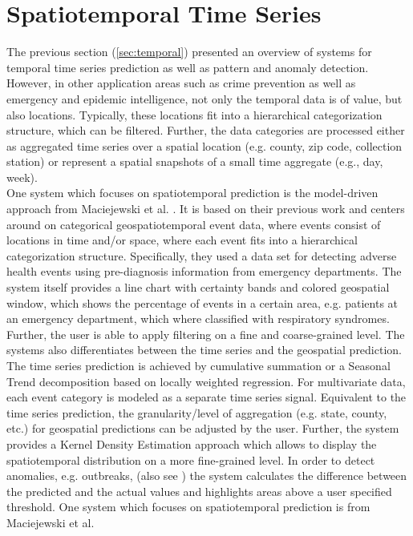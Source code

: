 \documentclass[electronic]{vgtc}             %
\begin{document}
\section{Spatiotemporal Time Series\label{sec:spatiotemp}}
The previous section (\autoref{sec:temporal}) presented an overview of systems for temporal time series prediction as well as pattern and anomaly detection. 
However, in other application areas such as crime prevention as well as emergency and epidemic intelligence, not only the temporal data is of value, but also locations. 
Typically, these locations fit into a hierarchical categorization structure, which can be filtered.
Further, the data categories are processed either as aggregated time series over a spatial location (e.g. county, zip code, collection station) or represent a spatial snapshots of a small time aggregate (e.g., day, week).\\
One system which focuses on spatiotemporal prediction is the model-driven approach from Maciejewski et al. \cite{maciejewski:2011}.
It is based on their previous work \cite{maciejewski:2008, maciejewski:2007} and centers around on categorical geospatiotemporal event data, where events consist of locations
in time and/or space, where each event fits into a hierarchical categorization structure.
Specifically, they used a data set for detecting adverse health events using pre-diagnosis information from emergency departments.
The system itself provides a line chart with certainty bands and colored geospatial window, which shows the percentage of events in a certain area, e.g. patients at an emergency department, which where classified with respiratory syndromes.
Further, the user is able to apply filtering on a fine and coarse-grained level. 
The systems also differentiates between the time series and the geospatial prediction.
The time series prediction is achieved by cumulative summation or a Seasonal Trend decomposition based on locally weighted regression.
For multivariate data, each event category is modeled as a separate time series signal. 
Equivalent to the time series prediction, the granularity/level of aggregation (e.g. state, county, etc.) for geospatial predictions can be adjusted by the user.
Further, the system provides a Kernel Density Estimation approach which allows to display the spatiotemporal distribution on a more fine-grained level.
In order to detect anomalies, e.g. outbreaks, (also see ) the system calculates the difference between the predicted and the actual values and highlights areas above a user specified threshold.
One system which focuses on spatiotemporal prediction is from Maciejewski et al. 
\end{document}
